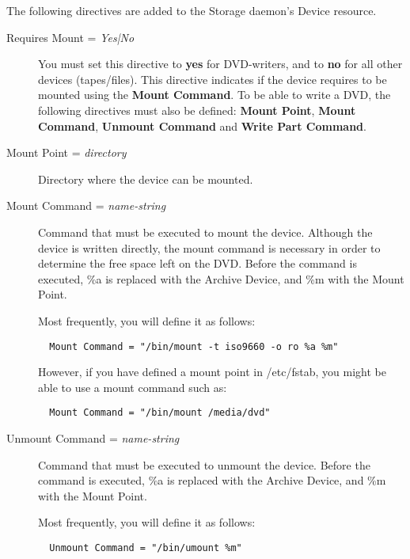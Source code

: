 The following directives are added to the Storage daemon's
Device resource.

\begin{description}

\item [Requires Mount = {\it Yes|No}]
   You must set this directive to {\bf yes} for DVD-writers,  and to {\bf no} for
   all other devices (tapes/files).  This directive indicates if the device
   requires to be mounted using the {\bf Mount Command}.
   To be able to write a DVD, the following directives must also be
   defined: {\bf Mount Point},  {\bf Mount Command}, {\bf Unmount Command} and
   {\bf Write Part Command}.

\item [Mount Point = {\it directory}]
   Directory where the device can be mounted. 

\item [Mount Command = {\it name-string}]
   Command that must be executed to mount the device. Although the
   device is written directly, the mount command is necessary in
   order to determine the free space left on the DVD. Before the command is 
   executed, \%a is replaced with the Archive Device, and \%m with the Mount 
   Point.

   Most frequently, you will define it as follows:  

\footnotesize
\begin{verbatim}
  Mount Command = "/bin/mount -t iso9660 -o ro %a %m"
\end{verbatim}
\normalsize

However, if you have defined a mount point in /etc/fstab, you might be
able to use a mount command such as:

\footnotesize
\begin{verbatim}
  Mount Command = "/bin/mount /media/dvd"
\end{verbatim}
\normalsize


\item [Unmount Command = {\it name-string}]
   Command that must be executed to unmount the device. Before the command  is
   executed, \%a is replaced with the Archive Device, and \%m with the  Mount
   Point.

   Most frequently, you will define it as follows:  

\footnotesize
\begin{verbatim}
  Unmount Command = "/bin/umount %m"
\end{verbatim}
\normalsize


\end{description}
